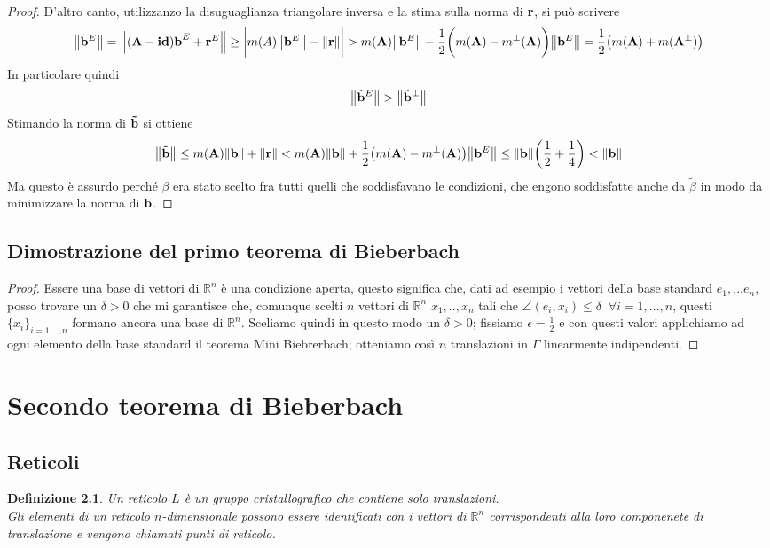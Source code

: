 \documentclass[a4paper]{book}
\newtheorem{definition}{Definizione}[section]
\begin{document}
\begin{proof}
D'altro canto, utilizzanzo la disuguaglianza triangolare inversa e la stima sulla norma di $\vb{r}$, si può scrivere
\[ \norm{\tilde{\vb{b}}^{E} }= \norm{(\vb{A-id) b}^{E} + \vb{r}^{E}} \geq \bigg| m(A) \norm{\vb{b}^E} - \norm{\vb{r}}\bigg| > m(\vb{A}) \norm{\vb{b}^E} - \frac{1}{2} \bigg( m(\vb{A}) - m^{\perp}(\vb{A})\bigg)\norm{\vb{b}^E} =  \frac{1}{2} \big( m(\vb{A}) + m(\vb{A}^{\perp}) \big)\]
In particolare quindi 
\[ \norm{\tilde{\vb{b}}^{E}} > \norm{\tilde{\vb{b}}^{\perp}}\]
Stimando la norma di $\vb{\tilde{b}}$ si ottiene 
\[ \norm{\tilde{\vb{b}}} \leq m(\vb{A}) \norm{\vb{b}} + \norm{\vb{r}} < m(\vb{A})\norm{\vb{b}} + \frac{1}{2} \big( m(\vb{A}) - m^{\perp}(\vb{A}) \big)\norm{\vb{b}^{E}} \leq  \norm{\vb{b}} \bigg( \frac{1}{2} + \frac{1}{4}\bigg) < \norm{\vb{b}} \]
Ma questo è assurdo perché $\beta$ era stato scelto fra tutti quelli che soddisfavano le condizioni, che engono soddisfatte anche da $\tilde{\beta}$  in modo da minimizzare la norma di $\vb{b}$.
\end{proof}

\section{Dimostrazione del primo teorema di Bieberbach}
\begin{proof}
Essere una base di vettori di $\mathbb{R}^n$ è una condizione aperta, questo significa che, dati ad esempio i vettori della base standard $ e_1, ...e_n$, posso trovare un $\delta >0$  che mi garantisce che, comunque scelti $n $ vettori di $\mathbb{R}^n$ $x_1, .., x_n$ tali che $ \angle(e_i, x_i) \leq \delta   \; \; \forall i = 1, ..., n$, questi $\{x_i \}_{i=1,..,n}$ formano ancora una base di $\mathbb{R}^n$.
Sceliamo quindi in questo modo un $\delta >0$; fissiamo $\epsilon = \frac{1}{2}$ e con questi valori applichiamo ad ogni elemento della base standard il teorema Mini Biebrerbach; otteniamo così $n$ translazioni in $\Gamma$ linearmente indipendenti. 
\end{proof}

\chapter{Secondo teorema di Bieberbach}

\section{Reticoli}
\begin{definition}
Un reticolo $L$ è un gruppo cristallografico che contiene solo translazioni. \\
Gli elementi di un reticolo $n$-dimensionale possono essere identificati con i vettori di $\mathbb{R}^n$ corrispondenti alla loro componenete di translazione e vengono chiamati punti di reticolo. 
\end{definition}
\end{document}
